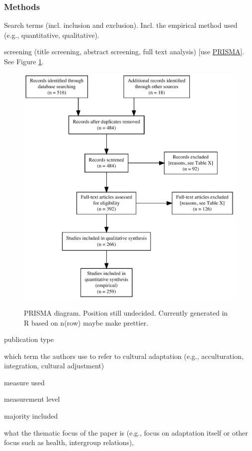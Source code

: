 \documentclass[man, 12pt, a4paper]{apa7}
\begin{document}
\subsubsection{Methods}
Search terms (incl. inclusion and exclusion). Incl. the empirical method used (e.g., quantitative, qualitative).

screening (title screening, abstract screening, full text analysis) [use \href{http://prisma-statement.org/PRISMAStatement/FlowDiagram}{PRISMA}].
See Figure \ref{fig:PRISMA}.
\begin{figure}[h]
\centering
\caption{PRISMA diagram. Position still undecided. Currently generated in R based on n(row) maybe make prettier.}
\includegraphics[width=\textwidth]{Figures/PRISMA}
\label{fig:PRISMA}
\end{figure}

publication type

which term the authors use to refer to cultural adaptation (e.g., acculturation, integration, cultural adjustment)

measure used

measurement level

majority included

what the thematic focus of the paper is (e.g., focus on adaptation itself or other focus such as health, intergroup relations), 
\end{document}
